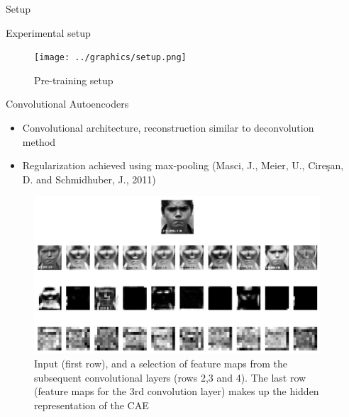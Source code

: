 \documentclass[final]{beamer}
\newlength{\sepwid}
\newlength{\onecolwid}
\begin{document}
\begin{frame}[t] %

\begin{columns}[t] %

\begin{column}{\sepwid}\end{column} %

\begin{column}{\onecolwid} %


\begin{alertblock}{Setup}

\begin{block}{Experimental setup}

\begin{figure}
\texttt{[image: ../graphics/setup.png]}
\caption{Pre-training setup}
\end{figure}

\end{block}

\begin{block}{Convolutional Autoencoders}

\begin{itemize}
	\item Convolutional architecture, reconstruction similar to deconvolution method 
	\item Regularization achieved using max-pooling (Masci, J., Meier, U., Cireşan, D. and Schmidhuber, J., 2011)
\end{itemize}

\begin{figure}

\captionsetup{format=default}

\includegraphics[width=0.8\linewidth]{../graphics/feature_map_walkthrough_ckplus.png}
\caption{Input (first row), and a selection of feature maps from the subsequent convolutional layers (rows 2,3 and 4). The last row (feature maps for the 3rd convolution layer) makes up the hidden representation of the CAE}
\end{figure}


\end{block}
\end{alertblock}
\end{column}
\end{columns}
\end{frame}
\end{document}
